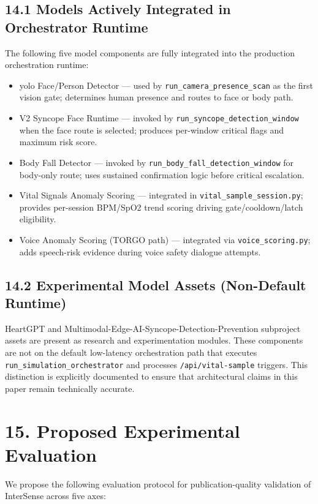 \documentclass[11pt,a4paper]{article}
\begin{document}
\subsection{14.1 Models Actively Integrated in Orchestrator Runtime}
The following five model components are fully integrated into the production orchestration runtime:
\begin{itemize}[leftmargin=1.4em]
  \item \gls{yolo} Face/Person Detector — used by \texttt{run\_camera\_presence\_scan} as the first vision gate; determines human presence and routes to face or body path.
  \item V2 Syncope Face Runtime — invoked by \texttt{run\_syncope\_detection\_window} when the face route is selected; produces per-window critical flags and maximum risk score.
  \item Body Fall Detector — invoked by \texttt{run\_body\_fall\_detection\_window} for body-only route; uses sustained confirmation logic before critical escalation.
  \item Vital Signals Anomaly Scoring — integrated in \texttt{vital\_sample\_session.py}; provides per-session BPM/SpO2 trend scoring driving gate/cooldown/latch eligibility.
  \item Voice Anomaly Scoring (TORGO path) — integrated via \texttt{voice\_scoring.py}; adds speech-risk evidence during voice safety dialogue attempts.
\end{itemize}

\subsection{14.2 Experimental Model Assets (Non-Default Runtime)}
HeartGPT and Multimodal-Edge-AI-Syncope-Detection-Prevention subproject assets are present as research and experimentation modules. These components are not on the default low-latency orchestration path that executes \texttt{run\_simulation\_orchestrator} and processes \texttt{/api/vital-sample} triggers. This distinction is explicitly documented to ensure that architectural claims in this paper remain technically accurate.

\section{15. Proposed Experimental Evaluation}
We propose the following evaluation protocol for publication-quality validation of InterSense across five axes:
\end{document}
